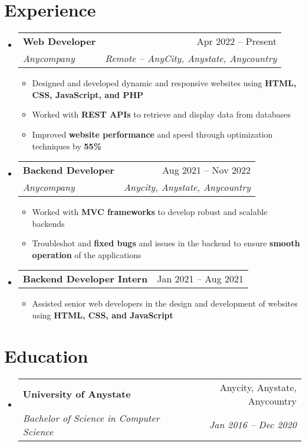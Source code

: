 \documentclass[a4paper,11pt]{article}
\makeatletter
\newcommand{\resumeItem}[1]{
	\item\small{#1}
}
\newcommand{\resumeItemListStart}{\begin{itemize}[rightmargin=0.11in]}
\newcommand{\resumeItemListEnd}{\end{itemize}}
\newcommand{\resumeQuadHeading}[4]{
	\item
	\begin{tabular*}{0.96\textwidth}[t]{l@{\extracolsep{\fill}}r}
		\textbf{#1} & #2 \\
		\textit{\small#3} & \textit{\small #4} \\
	\end{tabular*}
}
\newcommand{\resumeQuadHeadingChild}[2]{
	\item
	\begin{tabular*}{0.96\textwidth}[t]{l@{\extracolsep{\fill}}r}
		\textbf{\small#1} & {\small#2} \\
	\end{tabular*}
}
\newcommand{\resumeHeadingListStart}{
	\begin{itemize}[leftmargin=0.15in, label={}]
	}
\newcommand{\resumeHeadingListEnd}{\end{itemize}}
\makeatother
\begin{document}

	\section{Experience}
	\resumeHeadingListStart{}
	\resumeQuadHeading{Web Developer}{Apr 2022 -- Present}
	{Anycompany}{Remote -- AnyCity, Anystate, Anycountry}
	\resumeItemListStart{}
	\resumeItem{Designed and developed dynamic and responsive websites using \textbf{HTML, CSS, JavaScript, and PHP}}
	\resumeItem{Worked with \textbf{REST APIs} to retrieve and display data from databases}
	\resumeItem{Improved \textbf{website performance} and speed through optimization techniques by \textbf{55\%}}
	\resumeItemListEnd{}

	\resumeQuadHeading{Backend Developer}{Aug 2021 -- Nov 2022}
	{Anycompany}{Anycity, Anystate, Anycountry}
	\resumeItemListStart{}
	\resumeItem{Worked with \textbf{MVC frameworks} to develop robust and scalable backends}
	\resumeItem{Troubleshot and \textbf{fixed bugs} and issues in the backend to ensure \textbf{smooth operation} of the applications}
	\resumeItemListEnd{}

	\resumeQuadHeadingChild{Backend Developer Intern}{Jan 2021 -- Aug 2021}
	\resumeItemListStart{}
	\resumeItem{Assisted senior web developers in the design and development of websites using \textbf{HTML, CSS, and JavaScript}}
	\resumeItemListEnd{}
	\resumeHeadingListEnd{}



	\section{Education}
	\resumeHeadingListStart{}
	\resumeQuadHeading{University of Anystate}{Anycity, Anystate, Anycountry}
	{Bachelor of Science in Computer Science}{Jan 2016 -- Dec 2020}
	\resumeHeadingListEnd{}


\end{document}
